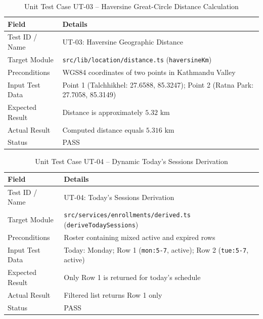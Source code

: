 \documentclass[12pt]{report}
\begin{document}
\begin{table}[H]
\centering
\caption{Unit Test Case UT-03 -- Haversine Great-Circle Distance Calculation}
\label{tab:ut03}
\small
\begin{tabular}{|p{3.2cm}|p{11.5cm}|}
\hline
\textbf{Field} & \textbf{Details} \\
\hline
Test ID / Name & UT-03: Haversine Geographic Distance \\
\hline
Target Module & \texttt{src/lib/location/distance.ts} (\texttt{haversineKm}) \\
\hline
Preconditions & WGS84 coordinates of two points in Kathmandu Valley \\
\hline
Input Test Data & Point 1 (Talchhikhel: 27.6588, 85.3247); Point 2 (Ratna Park: 27.7058, 85.3149) \\
\hline
Expected Result & Distance is approximately $5.32\text{ km}$ \\
\hline
Actual Result & Computed distance equals $5.316\text{ km}$ \\
\hline
Status & PASS \\
\hline
\end{tabular}
\end{table}

\begin{table}[H]
\centering
\caption{Unit Test Case UT-04 -- Dynamic Today's Sessions Derivation}
\label{tab:ut04}
\small
\begin{tabular}{|p{3.2cm}|p{11.5cm}|}
\hline
\textbf{Field} & \textbf{Details} \\
\hline
Test ID / Name & UT-04: Today's Sessions Derivation \\
\hline
Target Module & \texttt{src/services/enrollments/derived.ts} (\texttt{deriveTodaySessions}) \\
\hline
Preconditions & Roster containing mixed active and expired rows \\
\hline
Input Test Data & Today: Monday; Row 1 (\texttt{mon:5-7}, active); Row 2 (\texttt{tue:5-7}, active) \\
\hline
Expected Result & Only Row 1 is returned for today's schedule \\
\hline
Actual Result & Filtered list returns Row 1 only \\
\hline
Status & PASS \\
\hline
\end{tabular}
\end{table}
\end{document}

